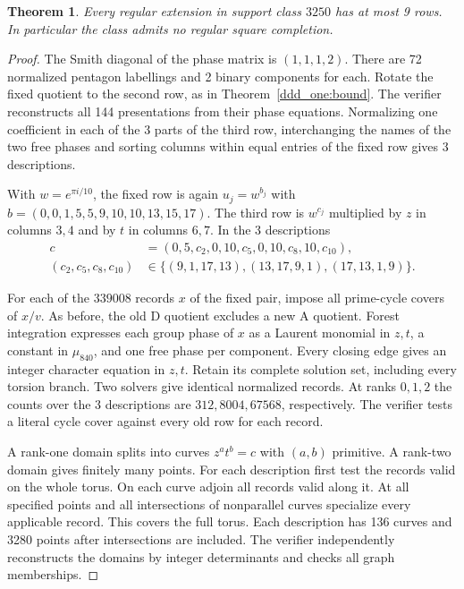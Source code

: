 \documentclass[11pt,a4paper]{article}
\newtheorem{theorem}{Theorem}[section]
\theoremstyle{plain}
\theoremstyle{definition}
\theoremstyle{plain}
\begin{document}
\par\addvspace{\medskipamount}\noindent
\begin{minipage}{\linewidth}
\begin{theorem}\label{ddd_pilots:3250}
Every regular extension in support class $3250$ has at most 9 rows. In particular the class admits no regular square completion.
\end{theorem}
\end{minipage}
\par\addvspace{\medskipamount}

\begin{proof}
The Smith diagonal of the phase matrix is $(1,1,1,2)$. There are 72 normalized pentagon labellings and 2 binary components for each. Rotate the fixed quotient to the second row, as in Theorem~\ref{ddd_one:bound}. The verifier reconstructs all 144 presentations from their phase equations. Normalizing one coefficient in each of the 3 parts of the third row, interchanging the names of the two free phases and sorting columns within equal entries of the fixed row gives 3 descriptions.

With $w=e^{\pi i/10}$, the fixed row is again $u_j=w^{b_j}$ with $b=(0,0,1,5,5,9,10,10,13,15,17)$. The third row is $w^{c_j}$ multiplied by $z$ in columns $3,4$ and by $t$ in columns $6,7$. In the 3 descriptions
$$\begin{aligned}
c&=(0,5,c_2,0,10,c_5,0,10,c_8,10,c_{10}),\\
(c_2,c_5,c_8,c_{10})&\in\{(9,1,17,13),(13,17,9,1),(17,13,1,9)\}.
\end{aligned}$$

For each of the $339008$ records $x$ of the fixed pair, impose all prime-cycle covers of $x/v$. As before, the old $\mathrm{D}$ quotient excludes a new $\mathrm{A}$ quotient. Forest integration expresses each group phase of $x$ as a Laurent monomial in $z,t$, a constant in $\mu_{840}$, and one free phase per component. Every closing edge gives an integer character equation in $z,t$. Retain its complete solution set, including every torsion branch. Two solvers give identical normalized records. At ranks $0,1,2$ the counts over the 3 descriptions are $312,8004,67568$, respectively. The verifier tests a literal cycle cover against every old row for each record.

A rank-one domain splits into curves $z^a t^b=c$ with $(a,b)$ primitive. A rank-two domain gives finitely many points. For each description first test the records valid on the whole torus. On each curve adjoin all records valid along it. At all specified points and all intersections of nonparallel curves specialize every applicable record. This covers the full torus. Each description has 136 curves and 3280 points after intersections are included. The verifier independently reconstructs the domains by integer determinants and checks all graph memberships.


\end{proof}
\end{document}
